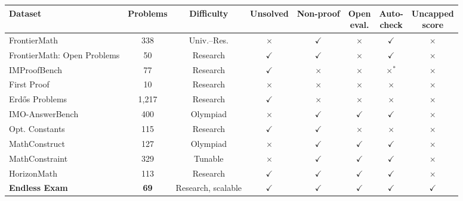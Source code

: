 \newcommand{\benchyes}{\textcolor{paperink}{$\checkmark$}}
\newcommand{\benchno}{\textcolor{papermuted}{$\times$}}
\begingroup
\fontsize{8.5}{10}\selectfont
\setlength{\tabcolsep}{3.2pt}
\newcommand{\benchhead}[1]{\begin{tabular}[c]{@{}c@{}}#1\end{tabular}}
\begin{tabularx}{\linewidth}{@{}Yccccccc@{}}
\toprule
Dataset & Problems & Difficulty & Unsolved & Non-proof & \benchhead{Open\\eval.} & \benchhead{Auto-\\check} & \benchhead{Uncapped\\score} \\
\midrule
FrontierMath & 338 & Univ.--Res. & \benchno & \benchyes & \benchno & \benchyes & \benchno \\
FrontierMath: Open Problems & 50 & Research & \benchyes & \benchyes & \benchno & \benchyes & \benchno \\
IMProofBench & 77 & Research & \benchyes & \benchno & \benchno & \benchno$^{*}$ & \benchno \\
First Proof & 10 & Research & \benchno & \benchno & \benchno & \benchno & \benchno \\
Erd\H{o}s Problems & 1,217 & Research & \benchyes & \benchno & \benchno & \benchno & \benchno \\
IMO-AnswerBench & 400 & Olympiad & \benchno & \benchyes & \benchyes & \benchyes & \benchno \\
Opt. Constants & 115 & Research & \benchyes & \benchyes & \benchno & \benchno & \benchno \\
MathConstruct & 127 & Olympiad & \benchno & \benchyes & \benchyes & \benchyes & \benchno \\
MathConstraint & 329 & Tunable & \benchno & \benchyes & \benchyes & \benchyes & \benchno \\
HorizonMath & 113 & Research & \benchyes & \benchyes & \benchyes & \benchyes & \benchno \\
\midrule
{}\textbf{Endless Exam} & \textbf{69} & Research, scalable & \benchyes & \benchyes & \benchyes & \benchyes & \benchyes \\
\bottomrule
\end{tabularx}
\endgroup
